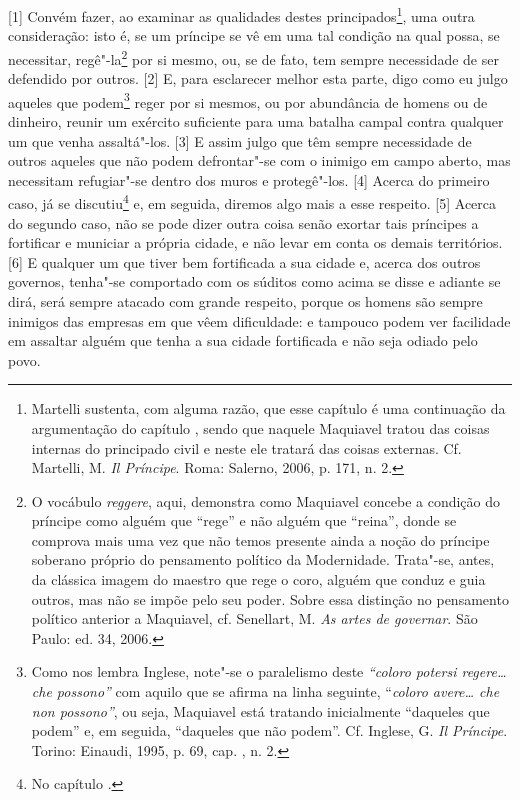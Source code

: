 {[}1{]} Convém fazer, ao examinar as qualidades destes
principados\footnote{Martelli sustenta, com alguma razão, que esse
  capítulo é uma continuação da argumentação do capítulo , sendo que
  naquele Maquiavel tratou das coisas internas do principado civil e
  neste ele tratará das coisas externas. Cf. Martelli, M. \emph{Il
  Príncipe}. Roma: Salerno, 2006, p. 171, n. 2.}, uma outra
consideração: isto é, se um príncipe se vê em uma tal condição na qual
possa, se necessitar, regê"-la\footnote{O vocábulo \emph{reggere}, aqui,
  demonstra como Maquiavel concebe a condição do príncipe como alguém
  que ``rege'' e não alguém que ``reina'', donde se comprova mais uma
  vez que não temos presente ainda a noção do príncipe soberano próprio
  do pensamento político da Modernidade. Trata"-se, antes, da clássica
  imagem do maestro que rege o coro, alguém que conduz e guia outros,
  mas não se impõe pelo seu poder. Sobre essa distinção no pensamento
  político anterior a Maquiavel, cf. Senellart, M. \emph{As artes de
  governar}. São Paulo: ed. 34, 2006.} por si mesmo, ou, se de fato, tem
sempre necessidade de ser defendido por outros. {[}2{]} E, para
esclarecer melhor esta parte, digo como eu julgo aqueles que
podem\footnote{Como nos lembra Inglese, note"-se o paralelismo deste
  \emph{``coloro potersi regere\ldots{} che possono''} com aquilo que se
  afirma na linha seguinte, ``\emph{coloro avere\ldots{} che non possono''},
  ou seja, Maquiavel está tratando inicialmente ``daqueles que podem''
  e, em seguida, ``daqueles que não podem''. Cf. Inglese, G. \emph{Il
  Príncipe}. Torino: Einaudi, 1995, p. 69, cap. , n. 2.} reger por si
mesmos, ou por abundância de homens ou de dinheiro, reunir um exército
suficiente para uma batalha campal contra qualquer um que venha
assaltá"-los. {[}3{]} E assim julgo que têm sempre necessidade de outros
aqueles que não podem defrontar"-se com o inimigo em campo aberto, mas
necessitam refugiar"-se dentro dos muros e protegê"-los. {[}4{]} Acerca do
primeiro caso, já se discutiu\footnote{No capítulo .} e, em seguida,
diremos algo mais a esse respeito. {[}5{]} Acerca do segundo caso, não
se pode dizer outra coisa senão exortar tais príncipes a fortificar e
municiar a própria cidade, e não levar em conta os demais territórios.
{[}6{]} E qualquer um que tiver bem fortificada a sua cidade e, acerca
dos outros governos, tenha"-se comportado com os súditos como acima se
disse e adiante se dirá, será sempre atacado com grande respeito, porque
os homens são sempre inimigos das empresas em que vêem dificuldade: e
tampouco podem ver facilidade em assaltar alguém que tenha a sua cidade
fortificada e não seja odiado pelo povo.

